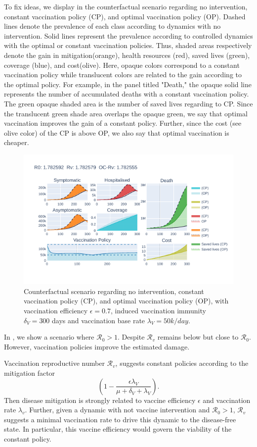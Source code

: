  To fix ideas,  we display in  the counterfactual 
scenario regarding no intervention, constant vaccination policy (CP), and 
optimal vaccination policy (OP). Dashed lines denote the prevalence of each 
class according to dynamics with no intervention. Solid lines represent the 
prevalence according to controlled dynamics with the optimal or constant 
vaccination policies. Thus, shaded areas respectively denote the gain in 
mitigation(orange), health resources (red), saved lives (green), coverage 
(blue), and cost(olive). Here, opaque colors correspond to a constant 
vaccination policy while translucent colors are related to the gain 
according to the optimal policy. For example, in the panel titled "Death,"  
the opaque solid line represents the number of accumulated deaths with a 
constant vaccination policy. The green opaque shaded area is the number of 
saved lives regarding to CP. Since the translucent green shade area overlaps the opaque 
green, we say that optimal vaccination improves the gain of a constant 
policy. Further, since the cost (see olive color) of the CP is above OP, we 
also say that optimal vaccination is cheaper.  
\begin{figure}[h!]
  \includegraphics[width=\textwidth]{fig1.pdf}
  \caption{Counterfactual scenario regarding no intervention, constant vaccination policy (CP), and 
optimal vaccination policy (OP), with vaccination efficiency $\epsilon = 0.7$, induced vaccination immunity 
$\delta_V= 300$ days and vaccination base rate $\lambda_V = 50 k/day$.}
  \label{fig:bocop_scene}
\end{figure}


In , we show a scenario where $\mathcal{R}_0>1$. Despite $\mathcal{R}_v$ remains below but close to $\mathcal{R}_0$.
However, vaccination policies improve the estimated damage.

Vaccination reproductive number $\mathcal{R}_v$, suggests constant policies 
according to the mitigation factor
$$
    \left(
        1 - 
        \frac{\epsilon \lambda_V}{\mu+\delta_V+\lambda_V}
    \right).
$$    
Then disease mitigation is strongly related to vaccine efficiency
$\epsilon$ and vaccination rate $\lambda_v$. Further, given a dynamic with 
not vaccine intervention and $\mathcal{R}_0>1$, $\mathcal{R}_v$ suggests a minimal vaccination rate to drive this dynamic to the disease-free state. 
In particular, this vaccine efficiency would govern the viability of the 
constant policy. 



